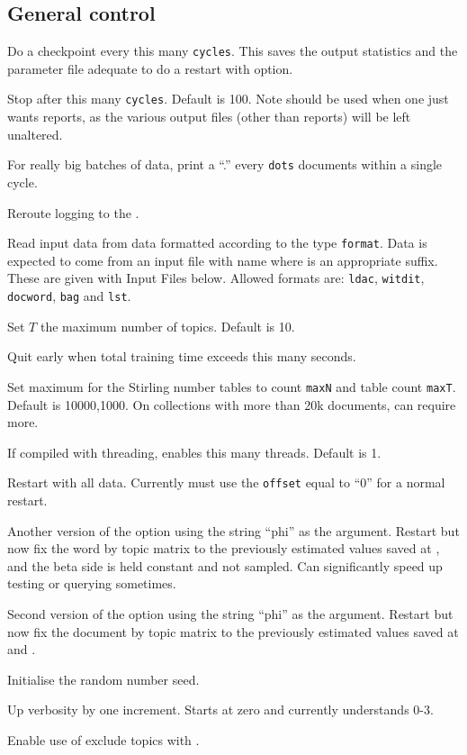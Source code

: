 \documentclass[a4paper,english]{article}
\begin{document}
\subsection{General control}
\begin{Description}\setlength{\itemsep}{0cm}
\item[\OptArg{-c}{cycles}] 
Do a checkpoint every this many \texttt{cycles}.
This saves the output statistics and the parameter file
adequate to do a restart with  option.
\item[\OptArg{-C}{cycles}] 
Stop after this many \texttt{cycles}.
Default is 100.
Note  should be used when one just wants reports,
as the various output files (other than reports) will be left unaltered.
\item[\OptArg{-d}{dots}] 
For really big batches of data, print a 
``.'' every \texttt{dots} documents within a single cycle.
\item[\Opt{-e}]
Reroute logging to the .
\item[\OptArg{-f}{format}] 
Read input data from data formatted according to
the type \texttt{format}.  Data is expected to come from
an input file with name  where
 is an appropriate suffix.
These are given with Input Files below.
Allowed formats are:
\texttt{ldac}, \texttt{witdit}, \texttt{docword}, 
\texttt{bag}
and \texttt{lst}.
\item[\OptArg{-K}{topics}] 
Set $T$ the maximum number of topics.
Default is 10.
\item[\OptArg{-M}{maxtime}] 
Quit early when total training time exceeds this many seconds.
\item[\OptArg{-N}{maxN,maxT}] 
Set maximum for the Stirling number tables
to count \texttt{maxN} and table count \texttt{maxT}.
Default is 10000,1000.
On collections with more than 20k documents, can require more.
\item[\OptArg{-q}{threads}] If compiled with threading, enables
this many threads.  Default is 1.
\item[\OptArg{-r}{0}]
Restart with all data.  Currently must use the \texttt{offset} equal to ``0''
for a normal restart.
\item[\OptArg{-r}{phi}]
Another version of the  option
using the string ``phi'' as the argument.
Restart but now fix the word by topic matrix
to the previously estimated values saved at 
,
and the beta side is held constant and not sampled.
Can significantly speed up testing or querying sometimes.
\item[\OptArg{-r}{theta}]
Second version of the  option
using the string ``phi'' as the argument.
Restart but now fix the document by topic matrix
to the previously estimated values saved at 
 and .
\item[\OptArg{-s}{seed}]
Initialise the random number seed.
\item[\Opt{-v}] Up verbosity by one increment.
Starts at zero and currently understands 0-3.
\item[\Opt{-x}] Enable use of exclude topics with .
\end{Description}
\end{document}
